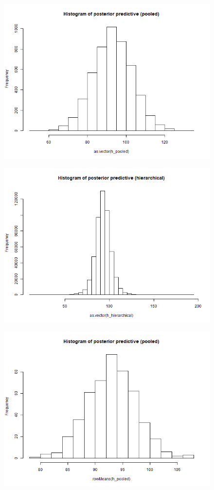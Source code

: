 \documentclass{article}
\begin{document}
{{\begin{figure}[H]
            \caption{}
        \end{figure}
        \begin{figure}[H]
            \centering
            \includegraphics[width = 0.8\linewidth]{posterior_predictive_pooled.png}
            \caption{}
        \end{figure}
        \begin{figure}[H]
            \centering
            \includegraphics[width = 0.8\linewidth]{posterior_predictive_hierarchical.png}
            \caption{}
        \end{figure}
        \begin{figure}[H]
            \centering
            \includegraphics[width = 0.8\linewidth]{posterior_predictive_mean_pooled.png}

\end{figure}}}
\end{document}
